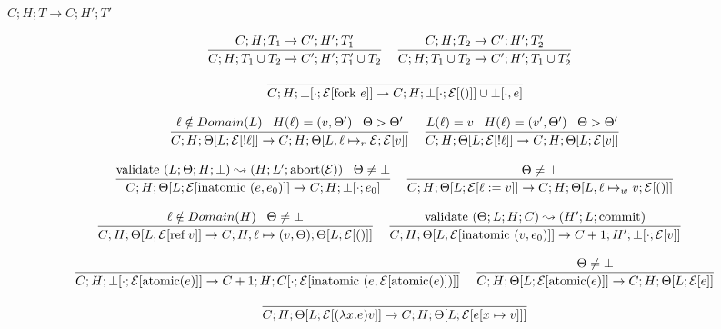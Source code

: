 \documentclass[9pt]{article}
\newcommand{\eval}[1]{\mathcal{E}[#1]}
\newcommand{\ctxt}[0]{\mathcal{E}}
\newcommand{\loc}[0]{\ell}
\newcommand{\atomic}[1]{\text{atomic}(#1)}
\newcommand{\alloc}[1]{\text{ref} \; #1}
\newcommand{\commit}[0]{\text{commit}}
\newcommand{\abort}[1]{\text{abort}(#1)}
\newcommand{\fork}[1]{\text{fork } #1}
\newcommand{\inatomic}[1]{\text{inatomic }(#1)}
\newcommand{\validate}[1]{\text{validate }(#1)}
\begin{document}
$\boxed{C; H; T \rightarrow C; H' ;T'}$

\[%
\infer[]{C; H; T_1 \cup T_2 \rightarrow C'; H'; T_1' \cup T_2}{C; H; T_1 \rightarrow C'; H'; T_1'} \;\;\;
\infer[]{C; H; T_1 \cup T_2 \rightarrow C'; H'; T_1 \cup T_2'}{C; H; T_2 \rightarrow C'; H'; T_2'} \;\;\; 
\]

\[%
\infer[]{C; H; \bot[\cdot; \eval{\fork{e}}] \rightarrow C; H; \bot[\cdot; \eval{()}] \cup \bot[\cdot, e]}{}
\]

\[%
\infer[]{C; H; \Theta[L; \eval{!\loc}] \rightarrow C; H; \Theta[L, \loc \mapsto_r \ctxt; \eval{v}]}{\loc \notin Domain(L) \;\;\; H(\loc) = (v, \Theta') \;\;\; \Theta > \Theta'}  \;\;\;
\infer[]{C; H; \Theta[L; \eval{!\loc}] \rightarrow C; H; \Theta[L; \eval{v}]}{L(\loc) = v \;\;\; H(\loc) = (v', \Theta') \;\;\; \Theta > \Theta'} 
\]

\[%
\infer[]{C; H; \Theta[L; \eval{\inatomic{e, e_0}}] \rightarrow C; H; \bot[\cdot; e_0]}{\validate{L; \Theta; H; \bot} \leadsto (H; L'; \abort{\ctxt}) \;\;\; \Theta \neq \bot} \;\;\;
\infer[]{C; H; \Theta[L; \eval{\loc := v}] \rightarrow C; H; \Theta[L, \loc \mapsto_w v; \eval{()}]}{\Theta \neq \bot} 
\]

\[%
\infer[]{C; H; \Theta[L; \eval{\alloc{v}}] \rightarrow C; H, \loc \mapsto (v, \Theta); \Theta[L;  \eval{()}]}{\loc \notin Domain(H) \;\;\; \Theta \neq \bot} \;\;\;
\infer[]{C; H; \Theta[L; \eval{\inatomic{v, e_0}}] \rightarrow C+1; H'; \bot[\cdot; \eval{v}]}{\validate{\Theta; L; H; C} \leadsto (H'; L; \commit)} \;\;\;
\]

\[
\infer[]{C; H; \bot[\cdot; \eval{\atomic{e}}] \rightarrow C+1; H; C[\cdot; \eval{\inatomic{e, \eval{\atomic{e}}}}]}{} \;\;\;
\infer[]{C; H; \Theta[L; \eval{\atomic{e}}] \rightarrow C; H; \Theta[L; \eval{e}]}{\Theta \neq \bot}
\]

\[
\infer[]{C; H; \Theta[L; \eval{(\lambda x. e) v}] \rightarrow C; H; \Theta[L; \eval{e[x\mapsto v]}]}{}
\]


\endgroup
\end{document}
